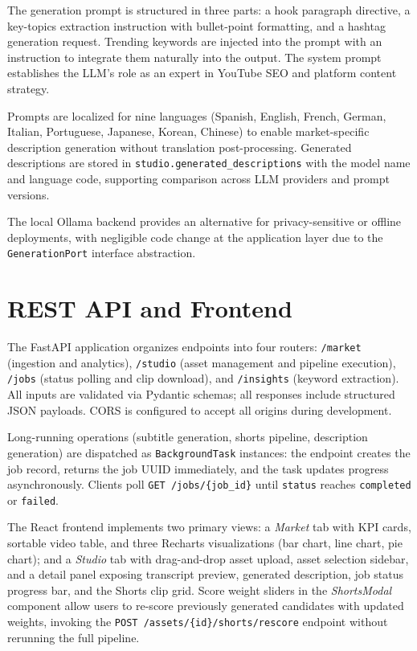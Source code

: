 \documentclass[ENG]{TFUOC}
\begin{document}
The generation prompt is structured in three parts: a hook paragraph directive, a key-topics extraction instruction with bullet-point formatting, and a hashtag generation request. Trending keywords are injected into the prompt with an instruction to integrate them naturally into the output. The system prompt establishes the LLM's role as an expert in YouTube SEO and platform content strategy.

Prompts are localized for nine languages (Spanish, English, French, German, Italian, Portuguese, Japanese, Korean, Chinese) to enable market-specific description generation without translation post-processing. Generated descriptions are stored in \texttt{studio.generated\_descriptions} with the model name and language code, supporting comparison across LLM providers and prompt versions.

The local Ollama backend provides an alternative for privacy-sensitive or offline deployments, with negligible code change at the application layer due to the \texttt{GenerationPort} interface abstraction.

\section{REST API and Frontend}

The FastAPI application organizes endpoints into four routers: \texttt{/market} (ingestion and analytics), \texttt{/studio} (asset management and pipeline execution), \texttt{/jobs} (status polling and clip download), and \texttt{/insights} (keyword extraction). All inputs are validated via Pydantic schemas; all responses include structured JSON payloads. CORS is configured to accept all origins during development.

Long-running operations (subtitle generation, shorts pipeline, description generation) are dispatched as \texttt{BackgroundTask} instances: the endpoint creates the job record, returns the job UUID immediately, and the task updates progress asynchronously. Clients poll \texttt{GET /jobs/\{job\_id\}} until \texttt{status} reaches \texttt{completed} or \texttt{failed}.

The React frontend implements two primary views: a \textit{Market} tab with KPI cards, sortable video table, and three Recharts visualizations (bar chart, line chart, pie chart); and a \textit{Studio} tab with drag-and-drop asset upload, asset selection sidebar, and a detail panel exposing transcript preview, generated description, job status progress bar, and the Shorts clip grid. Score weight sliders in the \textit{ShortsModal} component allow users to re-score previously generated candidates with updated weights, invoking the \texttt{POST /assets/\{id\}/shorts/rescore} endpoint without rerunning the full pipeline.
\end{document}
